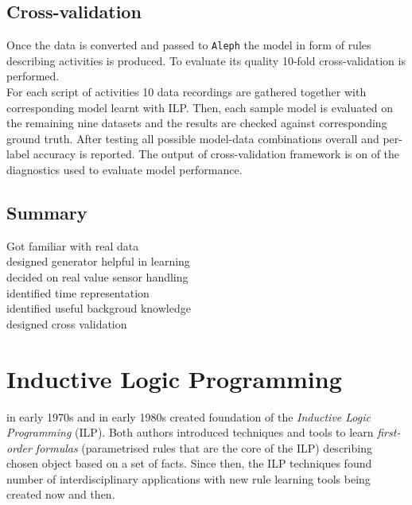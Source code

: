 \documentclass[10pt, a4paper, pdflatex, leqno, twoside, openright]{report}
\begin{document}
  \section{Cross-validation}
Once the data is converted and passed to \texttt{Aleph} the model in form of rules describing activities is produced. To evaluate its quality 10-fold cross-validation is performed.\\
For each script of activities 10 data recordings are gathered together with corresponding model learnt with ILP. Then, each sample model is evaluated on the remaining nine datasets and the results are checked against corresponding ground truth. After testing all possible model-data combinations overall and per-label accuracy is reported. The output of cross-validation framework is on of the diagnostics used to evaluate model performance.

  \section{Summary}
Got familiar with real data\\
designed generator helpful in learning\\
decided on real value sensor handling\\
identified time representation\\
identified useful backgroud knowledge\\
designed cross validation

\chapter{Inductive Logic Programming\label{ch:ILP}}
\citet{plotkin1972automatic} in early 1970s and \citet{shapiro1983algorithmic} in early 1980s created foundation of the \emph{Inductive Logic Programming} (ILP). Both authors introduced techniques and tools to learn \emph{first-order formulas} (parametrised rules that are the core of the ILP) describing chosen object based on a set of facts. Since then, the ILP techniques found number of interdisciplinary applications with new rule learning tools being created now and then.
\end{document}
